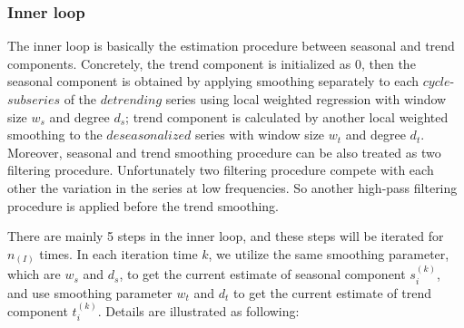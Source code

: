 \subsubsection{Inner loop}

The inner loop is basically the estimation procedure between seasonal and trend
components. Concretely, the trend component is initialized as 0, then the seasonal
component is obtained by applying smoothing separately to each $cycle$-$subseries$ 
of the $detrending$ series using local weighted regression with window size $w_s$ 
and degree $d_s$; trend component is calculated by another local weighted smoothing
to the $deseasonalized$ series with window size $w_t$ and degree $d_t$. Moreover, 
seasonal and trend smoothing procedure can be also treated as two filtering 
procedure. Unfortunately two filtering procedure compete with each other the 
variation in the series at low frequencies. So another high-pass filtering procedure
is applied before the trend smoothing.

There are mainly 5 steps in the inner loop, and these steps will be iterated for
$n_{(I)}$ times. In each iteration time $k$, we utilize the same smoothing parameter,
which are $w_s$ and $d_s$, to get the current estimate of seasonal component 
$s_i^{(k)}$, and use smoothing parameter $w_t$ and $d_t$ to get the current 
estimate of trend component $t_i^{(k)}$. Details are illustrated as following:

